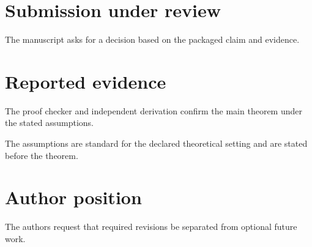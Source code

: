 \documentclass{article}
\begin{document}
\section{Submission under review}
The manuscript asks for a decision based on the packaged claim and evidence.
\section{Reported evidence}
The proof checker and independent derivation confirm the main theorem under the stated assumptions.

The assumptions are standard for the declared theoretical setting and are stated before the theorem.
\section{Author position}
The authors request that required revisions be separated from optional future work.
\end{document}
